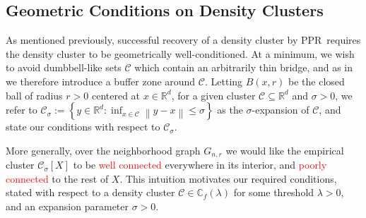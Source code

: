 \documentclass{article}
\newcommand{\set}[1]{\left\{#1\right\}}
\newcommand{\Reals}{\mathbb{R}}
\newcommand{\Rd}{\Reals^d}
\newcommand{\norm}[1]{\left\lVert#1\right\rVert}
\newcommand{\1}{\mathbf{1}}
\newcommand{\Xbf}{X}             %
\newcommand{\Cbb}{\mathbb{C}}
\newcommand{\Cset}{\mathcal{C}}
\newcommand{\Csig}{\Cset_{\sigma}}
\newcommand{\pprspace}{{\sc PPR~}}
\theoremstyle{aldenthm}
\theoremstyle{aldenrmrk}
\begin{document}
\subsection{Geometric Conditions on Density Clusters}
\label{subsec: geometric_conditions}

As mentioned previously, successful recovery of a density cluster by \pprspace requires the density cluster to be geometrically well-conditioned. At a minimum, we wish to avoid dumbbell-like sets $\Cset$ which contain an arbitrarily thin bridge, and as in \cite{chaudhuri2010} we therefore introduce a buffer zone around $\Cset$. Letting $B(x,r)$ be the closed ball of radius $r > 0$ centered at $x \in \Rd$, for a given cluster $\Cset \subseteq \Rd$ and $\sigma > 0$, we refer to $\Csig := \set{y \in \Reals^d: \inf_{x \in \Cset} \norm{y - x} \leq \sigma}$ as the $\sigma$-expansion of $\Cset$, and state our conditions with respect to $\Csig$.

More generally, over the neighborhood graph $G_{n,r}$ we would like the empirical cluster $\Csig[\Xbf]$ to be \textcolor{red}{well connected} everywhere in its interior, and \textcolor{red}{poorly connected} to the rest of $\Xbf$.  This intuition motivates our required conditions, stated with respect to a density
cluster $\Cset \in \Cbb_f(\lambda)$ for some threshold $\lambda > 0$, and an
expansion parameter $\sigma > 0$.
\end{document}
